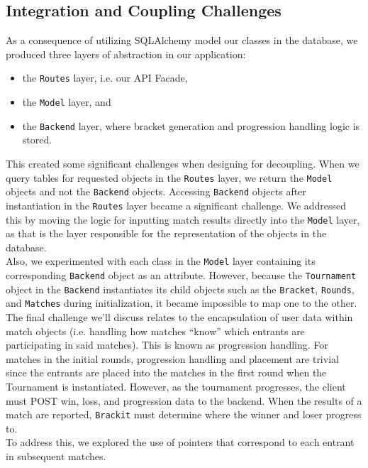 \documentclass{article}
\begin{document}
\subsection{Integration and Coupling Challenges}
As a consequence of utilizing SQLAlchemy model our classes in the database, we produced three 
layers of abstraction in our application: 
\begin{itemize}
    \item{the \texttt{Routes} layer, i.e. our API Facade, }
    \item{the \texttt{Model} layer, and}
    \item{the \texttt{Backend}
    layer, where bracket generation and progression handling logic is stored.}
\end{itemize}  This created some significant
challenges when designing for decoupling. When we query tables for requested objects in the \texttt{Routes} layer, 
we return the \texttt{Model} objects and not the \texttt{Backend} objects. Accessing \texttt{Backend} objects
after instantiation in the \texttt{Routes} layer became a significant challenge. We addressed this by moving the logic for inputting
match results directly into the \texttt{Model} layer, as that is the layer responsible for the representation of the objects 
in the database. \\
Also, we experimented with each class in the \texttt{Model} layer containing its corresponding \texttt{Backend} object 
as an attribute. However, because the \texttt{Tournament} object in the \texttt{Backend} instantiates its child objects such as the \texttt{Bracket}, 
\texttt{Rounds}, and \texttt{Matches} during initialization, it became impossible to map one to the other.
\\The final challenge we'll discuss relates to the encapsulation of user data within match objects (i.e. handling how matches ``know'' which entrants are participating in said matches). This is known as progression handling. For matches in the initial rounds, progression handling and placement are trivial since 
the entrants are placed into the matches in the first round when the Tournament is instantiated. However, as the tournament progresses, the client must POST win, loss, and progression data to the backend.
When the results of a match are reported, \texttt{Brackit} must determine where the winner and loser progress to. \\
To address this, we explored the use of pointers that correspond to each entrant in subsequent matches. 
\end{document}
